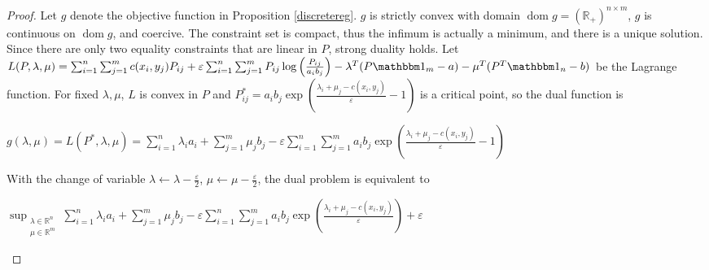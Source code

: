 \documentclass[12pt]{report}
\theoremstyle{definition}
\theoremstyle{remark}
\DeclareMathOperator{\dom}{dom}
\begin{document}
\begin{proof}
	Let $g$ denote the objective function in Proposition \ref{discretereg}. $g$ is strictly convex with domain $\dom g=(\mathbb R_+)^{n\times m}$, $g$ is continuous on $\dom g$, and coercive. The constraint set is compact, thus the infimum is actually a minimum, and there is a unique solution.\\
	Since there are only two equality constraints that are linear in $P$, strong duality holds. Let \\$L(P,\lambda,\mu)=\sum_{i=1}^n\sum_{j=1}^m c(x_i,y_j)P_{ij} + \varepsilon \sum_{i=1}^n\sum_{j=1}^m P_{ij}\log\left(\frac{P_{ij}}{a_i b_j} \right) - \lambda^T(P\mathbbm 1_m-a) - \mu^T(P^T \mathbbm 1_n -b)$ be the Lagrange function. For fixed $\lambda, \mu$, $L$ is convex in $P$ and $P_{ij}^* =a_i b_j \exp\left(\frac{\lambda_i+\mu_j-c(x_i,y_j)}{\varepsilon}-1 \right)$ is a critical point, so the dual function is \begin{center}
		$g(\lambda, \mu) = L(P^*,\lambda,\mu) = \sum_{i=1}^n \lambda_i a_i+\sum_{j=1}^m \mu_j b_j - \varepsilon \sum_{i=1}^n\sum_{j=1}^m a_i b_j \exp\left(\frac{\lambda_i+\mu_j-c(x_i,y_j)}{\varepsilon}-1 \right)$
	\end{center}
		With the change of variable $\lambda \leftarrow \lambda-\frac{\varepsilon}2$, $\mu \leftarrow \mu-\frac{\varepsilon}2$, the dual problem is equivalent to
	\begin{center}
		$\displaystyle \sup_{\substack{\lambda\in \mathbb R^n\\ \mu\in \mathbb R^m}} \sum_{i=1}^n \lambda_i a_i+\sum_{j=1}^m \mu_j b_j - \varepsilon \sum_{i=1}^n\sum_{j=1}^m a_i b_j \exp\left(\frac{\lambda_i+\mu_j-c(x_i,y_j)}{\varepsilon}\right) + \varepsilon$
	\end{center}
\end{proof}
\end{document}
